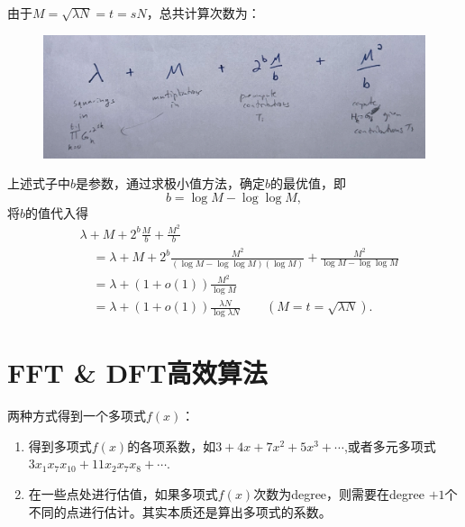 \documentclass[10pt]{ctexart}
\begin{document}
由于$M = \sqrt{\lambda N} = t = sN$，总共计算次数为：
\begin{figure}[H]
    \centering
    \includegraphics[width=1\textwidth]{./img/operates.png} 
\end{figure}
上述式子中$b$是参数，通过求极小值方法，确定$b$的最优值，即
$$
b = \log M - \log \log M,
$$
将$b$的值代入得
\begin{displaymath}
    \begin{aligned}
         & \lambda + M +  2^b \frac{M}{b} + \frac{M^2}{b} \\
         & \quad = \lambda + M +  2^b \frac{M^2}{\left(\log M - \log \log M\right)\left(\log M\right)} + \frac{M^2}{\log M - \log \log M} \\
         & \quad = \lambda + (1 + o(1))\frac{M^2}{\log M} \\
         & \quad = \lambda + (1 + o(1))\frac{\lambda N}{\log \lambda N} \quad \quad(M = t = \sqrt{\lambda N}).
    \end{aligned}
\end{displaymath}

\section{FFT \& DFT高效算法}
两种方式得到一个多项式$f(x)$：
\begin{enumerate}
    \item 得到多项式$f(x)$的各项系数，如$3+4x+7x^2+5x^3+\cdots$,或者多元多项式$3x_1x_7x_{10} + 11x_2x_7x_{8}+\cdots$.
    \item 在一些点处进行估值，如果多项式$f(x)$次数为degree，则需要在degree $+1$个不同的点进行估计。其实本质还是算出多项式的系数。
\end{enumerate}
\end{document}
